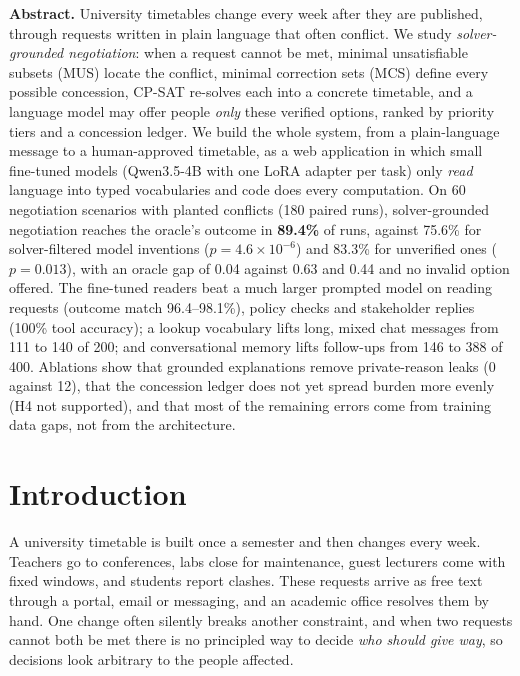 \documentclass[11pt,a4paper]{article}
\begin{document}
\begin{keybox}
\small\textbf{Abstract.} University timetables change every week after they are published, through requests
written in plain language that often conflict. We study \emph{solver-grounded negotiation}: when a request cannot
be met, minimal unsatisfiable subsets (MUS) locate the conflict, minimal correction sets (MCS) define every
possible concession, CP-SAT re-solves each into a concrete timetable, and a language model may offer people
\emph{only} these verified options, ranked by priority tiers and a concession ledger. We build the whole system,
from a plain-language message to a human-approved timetable, as a web application in which small fine-tuned
models (Qwen3.5-4B with one LoRA adapter per task) only \emph{read} language into typed vocabularies and code does
every computation. On 60 negotiation scenarios with planted conflicts (180 paired runs), solver-grounded
negotiation reaches the oracle's outcome in \textbf{89.4\%} of runs, against 75.6\% for solver-filtered model
inventions ($p=4.6\times10^{-6}$) and 83.3\% for unverified ones ($p=0.013$), with an oracle gap of 0.04 against
0.63 and 0.44 and no invalid option offered. The fine-tuned readers beat a much larger prompted model on reading
requests (outcome match 96.4--98.1\%), policy checks and stakeholder replies (100\% tool accuracy); a lookup
vocabulary lifts long, mixed chat messages from 111 to 140 of 200; and conversational memory lifts follow-ups from
146 to 388 of 400. Ablations show that grounded explanations remove private-reason leaks (0 against 12), that the
concession ledger does not yet spread burden more evenly (H4 not supported), and that most of the remaining errors
come from training data gaps, not from the architecture.
\end{keybox}

\section{Introduction}
A university timetable is built once a semester and then changes every week. Teachers go to conferences, labs
close for maintenance, guest lecturers come with fixed windows, and students report clashes. These requests arrive
as free text through a portal, email or messaging, and an academic office resolves them by hand. One change often
silently breaks another constraint, and when two requests cannot both be met there is no principled way to decide
\emph{who should give way}, so decisions look arbitrary to the people affected.
\end{document}
